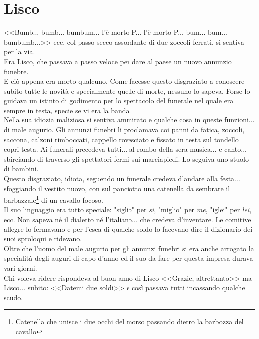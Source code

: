 
\chapter{Lisco}
<<Bumb... bumb... bumbum... l'è morto P\:.\:.\:. l'è morto P\:.\:.\:. bum... bum... bumbumb...>> ecc. col passo secco assordante di due zoccoli ferrati, si sentiva per la via.\\
\indent Era Lisco, che passava a passo veloce per dare al paese un nuovo annunzio funebre.\\
\indent E ciò appena era morto qualcuno. Come facesse questo disgraziato a conoscere subito tutte le novità e specialmente quelle di morte, nessuno lo sapeva. Forse lo guidava un istinto di godimento per lo spettacolo del funerale nel quale era sempre in testa, specie se vi era la banda.\\
\indent Nella sua idiozia maliziosa si sentiva ammirato e qualche cosa in queste funzioni... di male augurio. Gli annunzi funebri li proclamava coi panni da fatica, zoccoli, saccona, calzoni rimboccati, cappello rovesciato e fissato in testa sul tondello copri testa. Ai funerali precedeva tutti... al rombo della sera musica... e canto... sbirciando di traverso gli spettatori fermi sui marciapiedi. Lo seguiva uno stuolo di bambini.\\
\indent Questo disgraziato, idiota, seguendo un funerale credeva d'andare alla festa... sfoggiando il vestito nuovo, con sul panciotto una catenella da sembrare il barbazzale\footnote{Catenella che unisce i due occhi del morso passando dietro la barbozza del cavallo} di un cavallo focoso.\\
\indent Il suo linguaggio era tutto speciale: "siglio" per \emph{si}, "miglio" per \emph{me}, "iglei" per \emph{lei}, ecc. Non sapeva né il dialetto né l'italiano... che credeva d'inventare. Le comitive allegre lo fermavano e per l'esca di qualche soldo lo facevano dire il dizionario dei suoi sproloqui e ridevano.\\
\indent Oltre che l'uomo del male augurio per gli annunzi funebri si era anche arrogato la specialità degli auguri di capo d'anno ed il suo da fare per questa impresa durava vari giorni.\\
\indent Chi voleva ridere rispondeva al buon anno di Lisco <<Grazie, altrettanto>> ma Lisco... subito: <<Datemi due soldi>> e così passava tutti incassando qualche scudo.\\
